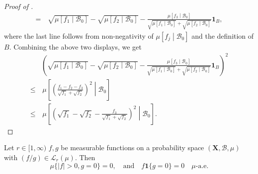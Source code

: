 \begin{proof}[Proof of ]
\begin{equation*}
\begin{split}
    =
    & \,
    \sqrt{\mu \left[ f_{1} \middle| \mathcal{B}_{0} \right]} - \sqrt{\mu \left[
    f_{2} \middle| \mathcal{B}_{0} \right]} - \frac{\mu \left[ f_{3} \middle|
    \mathcal{B}_{0} \right]}{\sqrt{\mu \left[ f_{1} \middle| \mathcal{B}_{0}
    \right]} + \sqrt{\mu \left[ f_{2} \middle| \mathcal{B}_{0} \right]}}
    \mathbf{1}_{B},
  \end{split}
\end{equation*}
where the last line follows from non-negativity of \(\mu \left[ f_{j} \middle|
\mathcal{B}_{0} \right]\) and the definition of \(B\).
Combining the above two displays, we get
\begin{equation*}
  \begin{split}
    & \left( \sqrt{\mu \left[ f_{1} \middle| \mathcal{B}_{0} \right]} -
    \sqrt{\mu \left[ f_{2} \middle| \mathcal{B}_{0} \right]} -
    \frac{\mu \left[ f_{3} \middle| \mathcal{B}_{0} \right]}{\sqrt{\mu \left[
    f_{1} \middle| \mathcal{B}_{0} \right]} + \sqrt{\mu \left[ f_{2} \middle|
    \mathcal{B}_{0} \right]}} \mathbf{1}_{B} \right)^{2} \\
    \leq & \, \mu \left[ \left( \frac{f_{1} - f_{2} -
    f_{3}}{\sqrt{f_{1}} + \sqrt{f_{2}}} \right)^{2} \middle| \mathcal{B}_{0}
    \right] \\
    \leq
    & \, \mu \left[ \left( \sqrt{f_{1}} - \sqrt{f_{2}} -
    \frac{f_{3}}{\sqrt{f_{1}} + \sqrt{f_{2}}} \right)^{2} \middle|
    \mathcal{B}_{0} \right].
  \end{split}
\end{equation*}
\end{proof}

\begin{lemma}
\label{lem--ratio-integrable-implication}
Let \(r \in [1, \infty)\) \(f, g\) be measurable functions on a probability
space \((\mathbf{X}, \mathcal{B}, \mu)\) with \((f / g) \in
\mathscr{L}_{r} (\mu)\).
Then
\begin{equation}
  \mu \{|f| > 0, g = 0\} = 0, \quad \text{and} \quad f \mathbf{1} \{g = 0\} = 0
  \quad \mu\text{-a.e}.
  \label{eqn--ratio-integrable-implication}
\end{equation}
\end{lemma}

